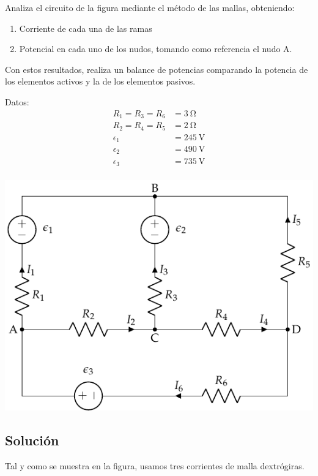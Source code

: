 \documentclass[10pt]{article}
\begin{document}
Analiza el circuito de la figura mediante el método de las mallas, obteniendo:
\begin{enumerate}
\item Corriente de cada una de las ramas
\item Potencial en cada uno de los nudos, tomando como referencia el
  nudo A.
\end{enumerate}

Con estos resultados, realiza un balance de potencias comparando la potencia de los elementos activos y la de los elementos pasivos.

\begin{minipage}{0.4\linewidth}
  Datos:
  \begin{align*}
    R_1 = R_3 = R_6 &= \SI{3}{\ohm}\\
    R_2 = R_4 = R_5 &= \SI{2}{\ohm}\\
    \epsilon_1 &= \SI{245}{\volt}\\
    \epsilon_2 &= \SI{490}{\volt}\\
    \epsilon_3 &= \SI{735}{\volt}\\
  \end{align*}
\end{minipage}
\begin{minipage}{0.6\linewidth}
  \includegraphics{figs/mallas1.pdf}
\end{minipage}

\subsection*{Solución}

Tal y como se muestra en la figura, usamos tres corrientes de malla dextrógiras. 
\end{document}
